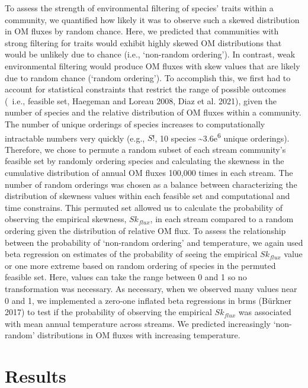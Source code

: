 \documentclass[
]{article}
\begin{document}
To assess the strength of environmental filtering of species' traits
within a community, we quantified how likely it was to observe such a
skewed distribution in OM fluxes by random chance. Here, we predicted
that communities with strong filtering for traits would exhibit highly
skewed OM distributions that would be unlikely due to chance (i.e.,
`non-random ordering'). In contrast, weak environmental filtering would
produce OM fluxes with skew values that are likely due to random chance
(`random ordering'). To accomplish this, we first had to account for
statistical constraints that restrict the range of possible outcomes
(~i.e., feasible set, Haegeman and Loreau 2008, Diaz et al. 2021), given
the number of species and the relative distribution of OM fluxes within
a community. The number of unique orderings of species increases to
computationally intractable numbers very quickly (e.g., \(S!\), 10
species \textasciitilde3.6e\textsuperscript{6} unique orderings).
Therefore, we chose to permute a random subset of each stream
community's feasible set by randomly ordering species and calculating
the skewness in the cumulative distribution of annual OM fluxes 100,000
times in each stream. The number of random orderings was chosen as a
balance between characterizing the distribution of skewness values
within each feasible set and computational and time constrains. This
permuted set allowed us to calculate the probability of observing the
empirical skewness, \(Sk_{flux}\), in each stream compared to a random
ordering given the distribution of relative OM flux. To assess the
relationship between the probability of `non-random ordering' and
temperature, we again used beta regression on estimates of the
probability of seeing the empirical \(Sk_{flux}\) value or one more
extreme based on random ordering of species in the permuted feasible
set. Here, values can take the range between 0 and 1 so no
transformation was necessary. As necessary, when we observed many values
near 0 and 1, we implemented a zero-one inflated beta regressions in
brms (Bürkner 2017) to test if the probability of observing the
empirical \(Sk_{flux}\) was associated with mean annual temperature
across streams. We predicted increasingly `non-random' distributions in
OM fluxes with increasing temperature.

\hypertarget{results}{%
\section{Results}\label{results}}
\end{document}
